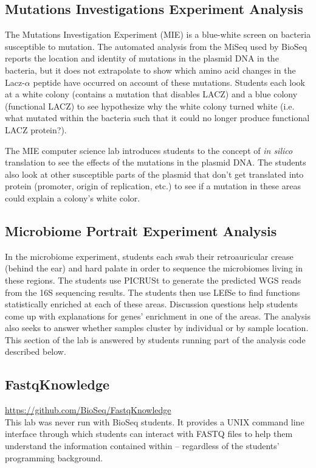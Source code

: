 \documentclass{report}
\begin{document}
\subsection{Mutations Investigations Experiment Analysis}
The Mutations Investigation Experiment (MIE) is a blue-white screen on bacteria susceptible to mutation. The automated analysis from the MiSeq used by BioSeq reports the location and identity of mutations in the plasmid DNA in the bacteria, but it does not extrapolate to show which amino acid changes in the Lacz-$\alpha$ peptide have occurred on account of these mutations. Students each look at a white colony (contains a mutation that disables LACZ) and a blue colony (functional LACZ) to see hypothesize why the white colony turned white (i.e. what mutated within the bacteria such that it could no longer produce functional LACZ protein?).

The MIE computer science lab introduces students to the concept of \emph{in silico} translation to see the effects of the mutations in the plasmid DNA. The students also look at other susceptible parts of the plasmid that don't get translated into protein (promoter, origin of replication, etc.) to see if a mutation in these areas could explain a colony's white color.

\subsection{Microbiome Portrait Experiment Analysis}
In the microbiome experiment, students each swab their retroauricular crease (behind the ear) and hard palate in order to sequence the microbiomes living in these regions. The students use PICRUSt to generate the predicted WGS reads from the 16S sequencing results. The students then use LEfSe \cite{segata2011metagenomic} to find functions statistically enriched at each of these areas. Discussion questions help students come up with explanations for genes' enrichment in one of the areas. The analysis also seeks to answer whether samples cluster by individual or by sample location. This section of the lab is answered by students running part of the analysis code described below.

\subsection{FastqKnowledge}
\url{https://github.com/BioSeq/FastqKnowledge}\\

\noindent This lab was never run with BioSeq students. It provides a UNIX command line interface through which students can interact with FASTQ files to help them understand the information contained within -- regardless of the students' programming background.
\end{document}
